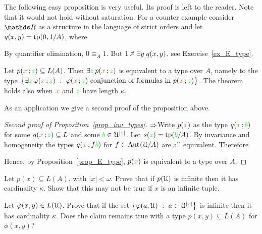 \documentclass[creche.tex]{subfiles}
\begin{document}
The following easy proposition is very useful. Its proof is left to the reader. Note that it would not hold without saturation. For a counter example consider $\RR$ as a structure in the language of strict orders and let $q(x,y)={\rm tp}(0,1/A)$, where 


By quantifier elimination, $0\equiv_{A}1$. But $1\nvDash\exists y\;q(x,y)$, see Exercise~\ref{ex_E_type}.


\begin{proposition}\label{prop_E_type}
Let $p({\color{brown} x}\,;{\color{green} z})\subseteq L(A)$. Then $\exists {\color{green}z}\,p({\color{brown} x}\,;{\color{green} z})$ is equivalent to a type over $A$, namely to the type $\big\{ \exists {\color{green}z}\,\varphi({\color{brown} x}\,;{\color{green} z})\ :\ \varphi({\color{brown} x}\,;{\color{green} z}) \textrm{ conjunction of formulas in } p({\color{brown} x}\,;{\color{green} z}) \big\}$. The theorem holds also when ${\color{brown} x}$ and ${\color{green} z}$ have length $\kappa$.\QED 
\end{proposition}

As an application we give a second proof of the proposition above.

\begin{proof}[Second proof of Proposition~\ref{prop_inv_types}] $\Rightarrow$\quad  Write $p({\color{brown} x})$ as the type $q({\color{brown} x}\,;{\color{green} b})$ for some $q({\color{brown} x}\,;{\color{green} z})\subseteq L$ and some ${\color{green} b}\in\EuScript U^{|{\color{green} z}|}$. Let $s({\color{green} z})={\rm tp}({\color{green} b}/A)$. By invariance and homogeneity the types $q({\color{brown} x}\,;f{\color{green} b})$ for $f\in\textrm{Aut\kern.15ex}(\EuScript U/A)$ are all equivalent. Therefore

\smallskip

\smallskip

\smallskip

Hence, by Proposition~\ref{prop_E_type}, $p({\color{brown} x})$ is equivalent to a type over $A$.
\end{proof}

\begin{exercise}\label{cadinalitafinitasaturazione}
Let $p(x)\subseteq L(A)$, with $|x|<\omega$. Prove that if $p(\EuScript U)$ is infinite then it has cardinality $\kappa$. Show that this may not be true if $x$ is an infinite tuple.\QED 
\end{exercise}

\begin{exercise}\label{cadinalitafinitasaturazioneinsiemi}
Let $\varphi(x,y)\in L(\EuScript U)$. Prove that if the set $\big\{\phi(a,\U)\ :\ a\in\U^{|x|}\big\}$ is infinite then it has cardinality $\kappa$. Does the claim remains true with a type $p(x,y)\subseteq L(A)$ for $\phi(x,y)$?\QED 
\end{exercise}
\end{document}
